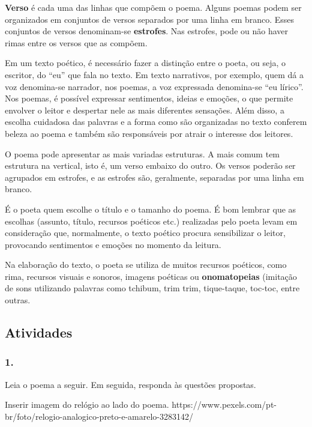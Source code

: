 \textbf{Verso} é cada uma das linhas que compõem o poema. Alguns poemas
podem ser organizados em conjuntos de versos separados por uma linha em
branco. Esses conjuntos de versos denominam-se \textbf{estrofes}. Nas
estrofes, pode ou não haver rimas entre os versos que as compõem.

Em um texto poético, é necessário fazer a distinção entre o poeta, ou
seja, o escritor, do ``eu'' que fala no texto. Em texto narrativos, por
exemplo, quem dá a voz denomina-se narrador, nos poemas, a voz
expressada denomina-se ``eu lírico''. Nos poemas, é possível expressar
sentimentos, ideias e emoções, o que permite envolver o leitor e
despertar nele as mais diferentes sensações. Além disso, a escolha
cuidadosa das palavras e a forma como são organizadas no texto conferem
beleza ao poema e também são responsáveis por atrair o interesse dos
leitores.

O poema pode apresentar as mais variadas estruturas. A mais comum tem
estrutura na vertical, isto é, um verso embaixo do outro. Os versos
poderão ser agrupados em estrofes, e as estrofes são, geralmente,
separadas por uma linha em branco.

É o poeta quem escolhe o título e o tamanho do poema. É bom lembrar que
as escolhas (assunto, título, recursos poéticos etc.) realizadas pelo
poeta levam em consideração que, normalmente, o texto poético procura
sensibilizar o leitor, provocando sentimentos e emoções no momento da
leitura.

Na elaboração do texto, o poeta se utiliza de muitos recursos poéticos,
como rima, recursos visuais e sonoros, imagens poéticas ou
\textbf{onomatopeias} (imitação de sons utilizando palavras como
tchibum, trim trim, tique-taque, toc-toc, entre outras.

\subsection{Atividades}\label{atividades-4}

\subsubsection{1. }\label{section-47}

Leia o poema a seguir. Em seguida, responda às questões propostas.

Inserir imagem do relógio ao lado do poema.
https://www.pexels.com/pt-br/foto/relogio-analogico-preto-e-amarelo-3283142/

